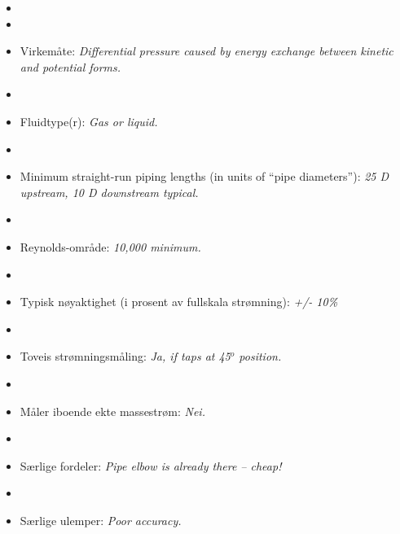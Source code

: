 \begin{itemize}
\goodbreak
\item{} 
\vskip 5pt
\item\item{} Virkemåte: {\it Differential pressure caused by energy exchange between kinetic and potential forms.}
\vskip 5pt
\item\item{} Fluidtype(r): {\it Gas or liquid.}
\vskip 5pt
\item\item{} Minimum straight-run piping lengths (in units of ``pipe diameters''): {\it 25 D upstream, 10 D downstream typical.}
\vskip 5pt
\item\item{} Reynolds-område: {\it 10,000 minimum.}
\vskip 5pt
\item\item{} Typisk nøyaktighet (i prosent av fullskala strømning): {\it +/- 10\%}
\vskip 5pt
\item\item{} Toveis strømningsmåling: {\it Ja, if taps at 45$^{o}$ position.}
\vskip 5pt
\item\item{} Måler iboende ekte massestrøm: {\it Nei.}
\vskip 5pt
\item\item{} Særlige fordeler: {\it Pipe elbow is already there -- cheap!}
\vskip 5pt
\item\item{} Særlige ulemper: {\it Poor accuracy.}
\end{itemize}

